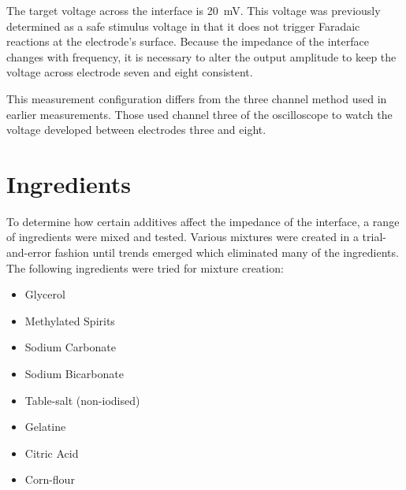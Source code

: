   The target voltage across the interface is \SI{20}{\milli\volt}.
  This voltage was previously determined as a safe stimulus voltage in that it does not trigger Faradaic reactions at the electrode's surface.
  Because the impedance of the interface changes with frequency, it is necessary to alter the output amplitude to keep the voltage across electrode seven and eight consistent.

  This measurement configuration differs from the three channel method used in earlier measurements.
  Those used channel three of the oscilloscope to watch the voltage developed between electrodes three and eight.


\section{Ingredients}


  To determine how certain additives affect the impedance of the interface, a range of ingredients were mixed and tested.
  Various mixtures were created in a trial-and-error fashion until trends emerged which eliminated many of the ingredients.
  The following ingredients were tried for mixture creation:
  \begin{itemize}
      \item Glycerol
      \item Methylated Spirits
      \item Sodium Carbonate
      \item Sodium Bicarbonate
      \item Table-salt (non-iodised)
      \item Gelatine
      \item Citric Acid
      \item Corn-flour
  \end{itemize}




